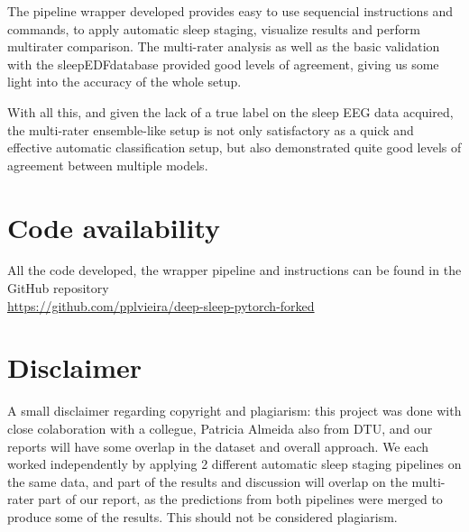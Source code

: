 The pipeline wrapper developed provides easy to use sequencial instructions and commands, to apply automatic sleep staging, visualize results and perform multirater comparison. The multi-rater analysis as well as the basic validation with the sleepEDFdatabase provided good levels of agreement, giving us some light into the accuracy of the whole setup.

With all this, and given the lack of a true label on the sleep EEG data acquired, the multi-rater ensemble-like setup is not only satisfactory as a quick and effective automatic classification setup, but also demonstrated quite good levels of agreement between multiple models.



\section*{Code availability}
All the code developed, the wrapper pipeline and instructions can be found in the GitHub repository \\
\href{https://github.com/pplvieira/deep-sleep-pytorch-forked}{https://github.com/pplvieira/deep-sleep-pytorch-forked}

\section*{Disclaimer}

A small disclaimer regarding copyright and plagiarism: this project was done with close colaboration with a collegue, Patricia Almeida also from DTU, and our reports will have some overlap in the dataset and overall approach. We each worked independently by applying 2 different automatic sleep staging pipelines on the same data, and part of the results and discussion will overlap on the multi-rater part of our report, as the predictions from both pipelines were merged to produce some of the results. This should not be considered plagiarism.

